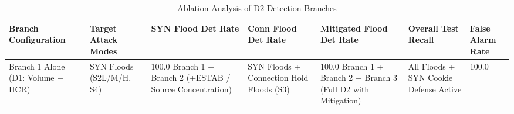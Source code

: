 \begin{table}
\caption{Ablation Analysis of D2 Detection Branches}
\label{tab:t4}
\begin{tabular}{lllllll}
\toprule
Branch Configuration & Target Attack Modes & SYN Flood Det Rate & Conn Flood Det Rate & Mitigated Flood Det Rate & Overall Test Recall & False Alarm Rate \\
\midrule
Branch 1 Alone (D1: Volume + HCR) & SYN Floods (S2L/M/H, S4) & 100.0%
Branch 1 + Branch 2 (+ESTAB / Source Concentration) & SYN Floods + Connection Hold Floods (S3) & 100.0%
Branch 1 + Branch 2 + Branch 3 (Full D2 with Mitigation) & All Floods + SYN Cookie Defense Active & 100.0%
\bottomrule
\end{tabular}
\end{table}
